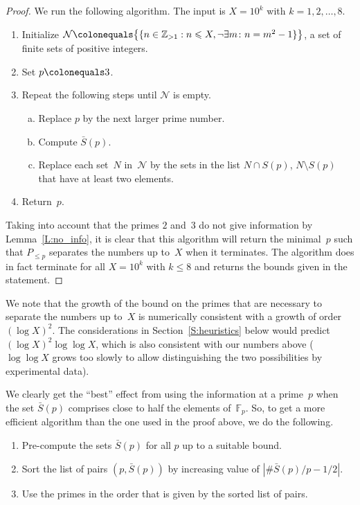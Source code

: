 \documentclass[12pt,a4paper]{amsart}
\newcommand{\Z}{{\mathbb Z}}
\newcommand{\F}{{\mathbb F}}
\newcommand{\CN}{{\mathcal N}}
\theoremstyle{definition}
\numberwithin{equation}{section}
\begin{document}
\begin{proof}
  We run the following algorithm. The input is $X = 10^k$ with $k = 1, 2, \ldots, 8$.
  \begin{enumerate}[1.]
    \item Initialize $\CN \colonequals \bigl\{\{n \in \Z_{> 1} : n \leqslant X, \neg\exists m \colon n = m^2 - 1\}\bigr\}$,
          a set of finite sets of positive integers.
    \item Set $p \colonequals 3$.
    \item Repeat the following steps until $\CN$ is empty.
          \begin{enumerate}[a.]
            \item Replace $p$ by the next larger prime number.
            \item Compute $\bar{S}(p)$.
            \item Replace each set~$N$ in~$\CN$ by the sets
                  in the list $N \cap S(p)$, $N \setminus S(p)$ that have at least two elements.
          \end{enumerate}
    \item Return~$p$.
  \end{enumerate}
  Taking into account that the primes $2$ and~$3$ do not give information by Lemma~\ref{L:no_info},
  it is clear that this algorithm will return the minimal~$p$ such that $P_{\leqslant p}$ separates
  the numbers up to~$X$ when it terminates. The algorithm does in fact terminate
  for all $X = 10^k$ with $k \leqslant 8$ and returns the bounds given in the statement.
\end{proof}

We note that the growth of the bound on the primes that are necessary to
separate the numbers up to~$X$ is numerically consistent with a growth of
order $(\log X)^2$. The considerations in Section~\ref{S:heuristics} below would
predict $(\log X)^2 \log \log X$, which is also consistent with our numbers above
($\log \log X$ grows too slowly to allow distinguishing the two possibilities
by experimental data).

We clearly get the ``best'' effect from using the information at a prime~$p$
when the set $\bar{S}(p)$ comprises close to half the elements of~$\F_p$.
So, to get a more efficient algorithm than the one used in the proof above,
we do the following.
\begin{enumerate}[1.]
  \item Pre-compute the sets $\bar{S}(p)$ for all $p$ up to a suitable bound.
  \item Sort the list of pairs $(p, \bar{S}(p))$ by increasing value of
        $|\#\bar{S}(p)/p - 1/2|$.
  \item Use the primes in the order that is given by the sorted list of pairs.
\end{enumerate}
\end{document}
